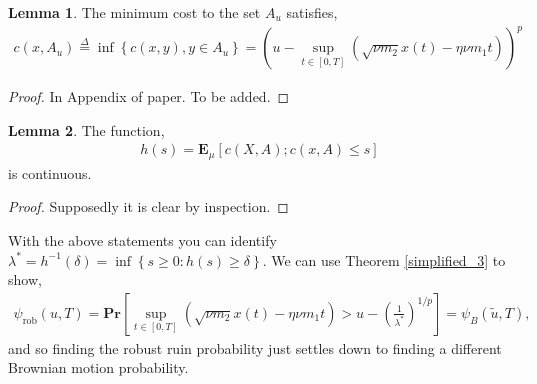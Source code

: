 \documentclass[12pt]{article}
\renewcommand{\Pr}{\textbf{Pr}}
\newcommand{\E}{\textbf{E}}
\newcommand{\define}{\overset{\Delta}{=}}
\theoremstyle{definition}
\theoremstyle{definition}
\newtheorem{lemma}{Lemma}
\theoremstyle{definition}
\begin{document}

\begin{lemma} The minimum cost to the set $A_u$ satisfies,
\begin{align*}
c(x,A_u) \define\inf\left\{c(x,y),y\in A_u\right\} = \left(u-\sup_{t\in[0,T]}\left(\sqrt{\nu m_2}x(t)-\eta \nu m_1t\right)\right)^p
\end{align*}
\begin{proof}
In Appendix of paper. To be added.
\end{proof}
\end{lemma}

\begin{lemma} The function,
\begin{align*}
h(s)=\E_{\mu}\left[c(X,A); c(x,A)\leq s\right]
\end{align*}
is continuous. 
\end{lemma}
\begin{proof} Supposedly it is clear by inspection.
\end{proof}

With the above statements you can identify $\lambda^*=h^{-1}(\delta)=\inf\left\{s\geq 0 : h(s)\geq \delta\right\}$. We can use Theorem \ref{simplified_3} to show,
\begin{align}
\psi_{\text{rob}}(u,T)= \Pr\left[\sup_{t\in[0,T]} \left(\sqrt{\nu m_2}x(t)-\eta \nu m_1t\right)>u -\left(\frac{1}{\lambda^*}\right)^{1/p}\right] = \psi_B(\tilde u, T),\label{Brownian_robust}
\end{align}
and so finding the robust ruin probability just settles down to finding a different Brownian motion probability. 
\end{document}
